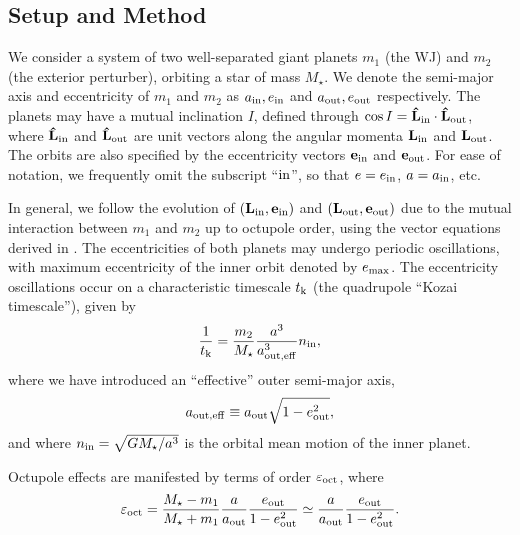 \documentclass[12pt,useAMS, usenatbib]{mn2e}
\newcommand{\be}{\begin{equation}}
\newcommand{\ee}{\end{equation}}
\newcommand{\Max}{{\rm max}}
\newcommand{\In}{{\rm in}}
\newcommand{\Out}{{\rm out}}
\newcommand{\oct}{{\rm oct}}
\newcommand{\ain}{a_\In}
\newcommand{\ein}{e_\In}
\newcommand{\aout}{a_\Out}
\newcommand{\eout}{e_\Out}
\newcommand{\emax}{e_\Max}
\newcommand{\hatLin}{{\bf \hat{L}}_\In}
\newcommand{\hatLout}{{\bf \hat{L}}_\Out}
\newcommand{\Lvec}{{\bf L}}
\newcommand{\evec}{{\bf e}}
\newcommand{\aouteff}{a_{\rm out,eff}}
\newcommand{\tk}{t_{\rm k}}
\begin{document}
\subsection{Setup and Method}
We consider a system of two well-separated giant planets $m_1$ (the WJ) and $m_2$ (the exterior perturber), orbiting a star of mass $M_\star$.  We denote the semi-major axis and eccentricity of $m_1$ and $m_2$ as $\ain, \ein$ and $\aout, \eout$ respectively.  The planets may have a mutual inclination $I$, defined through $\cos I = \hatLin \cdot \hatLout$, where $\hatLin$ and $\hatLout$ are unit vectors along the angular momenta $\Lvec_\In$ and $\Lvec_\Out$.  The orbits are also specified by the eccentricity vectors $\evec_\In$ and $\evec_\Out$. For ease of notation, we frequently omit the subscript ``$\In$'', so that $e = e_\In$, $a = \ain$, etc. 

In general, we follow the evolution of $(\Lvec_\In,\evec_\In)$ and $(\Lvec_\Out,\evec_\Out)$ due to the mutual interaction between $m_1$ and $m_2$ up to octupole order, using the vector equations derived in \cite{liu2015} \citep[see also][]{petrovich2015} . The eccentricities of both planets may undergo periodic oscillations, with maximum eccentricity of the inner orbit denoted by $\emax$.  The eccentricity oscillations occur on a characteristic timescale $\tk$ (the quadrupole ``Kozai timescale''), given by
\be
\frac{1}{\tk} = \frac{m_2}{M_\star} \frac{a^3}{\aouteff^3} n_\In,
\label{eq:tk}
\ee
where we have introduced an ``effective'' outer semi-major axis,
\be
\aouteff \equiv \aout \sqrt{1 - \eout^2},
\ee
and where $n_\In = \sqrt{G M_\star/a^3}$ is the orbital mean motion of the inner planet.

Octupole effects are manifested by terms of order $\varepsilon_\oct$, where
\be
\varepsilon_\oct = \frac{M_\star - m_1}{M_\star + m_1} \frac{a}{\aout} \frac{\eout}{1 - \eout^2} \simeq \frac{a}{\aout} \frac{\eout}{1 - \eout^2}.
\label{eq:epsoct}
\ee
\end{document}

